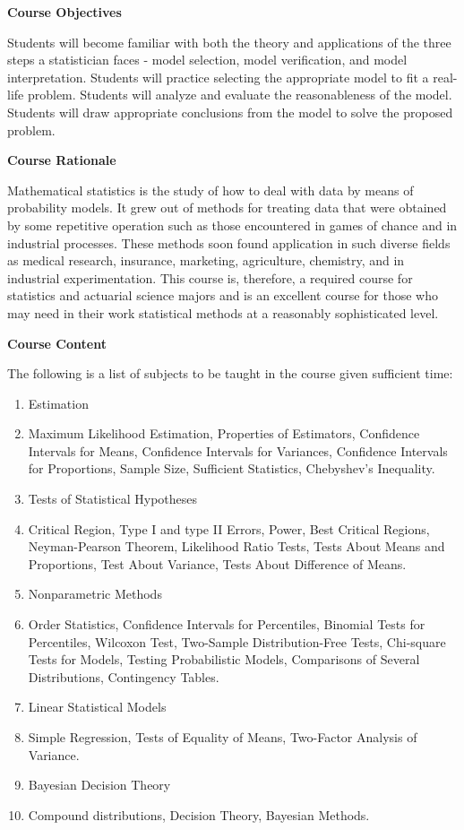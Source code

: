 \documentclass{article}
\begin{document}
\textbf{\large Course Objectives}\medskip

Students will become familiar with both the theory and applications of the three steps a statistician faces - model selection, model verification, and model interpretation. Students will practice selecting the appropriate model to fit a real-life problem. Students will analyze and evaluate the reasonableness of the model. Students will draw appropriate conclusions from the model to solve the proposed problem.\bigskip

\textbf{\large Course Rationale}\medskip

Mathematical statistics is the study of how to deal with data by means of probability models. It grew out of methods for treating data that were obtained by some repetitive operation such as those encountered in games of chance and in industrial processes. These methods soon found application in such diverse fields as medical research, insurance, marketing, agriculture, chemistry, and in industrial experimentation. This course is, therefore, a required course for statistics and actuarial science majors and is an excellent course for those who may need in their work statistical methods at a reasonably sophisticated level.\bigskip

\newpage

\textbf{\large Course Content}\medskip

The following is a list of subjects to be taught in the course given sufficient time:

\begin{enumerate}
    \item Estimation
    \item[]Maximum Likelihood Estimation, Properties of Estimators, Confidence Intervals for Means, Confidence Intervals for Variances, Confidence Intervals for Proportions, Sample Size, Sufficient Statistics, Chebyshev's Inequality.
    \item Tests of Statistical Hypotheses
    \item[] Critical Region, Type I and type II Errors, Power, Best Critical Regions, Neyman-Pearson Theorem, Likelihood Ratio Tests, Tests About Means and Proportions, Test About Variance, Tests About Difference of Means.
    \item Nonparametric Methods
    \item[] Order Statistics, Confidence Intervals for Percentiles, Binomial Tests for Percentiles, Wilcoxon Test, Two-Sample Distribution-Free Tests, Chi-square Tests for Models, Testing Probabilistic Models, Comparisons of Several Distributions, Contingency Tables.
    \item Linear Statistical Models
    \item[] Simple Regression, Tests of Equality of Means, Two-Factor Analysis of Variance.
    \item Bayesian Decision Theory
    \item[] Compound distributions, Decision Theory, Bayesian Methods.
\end{enumerate}\bigskip
\end{document}

